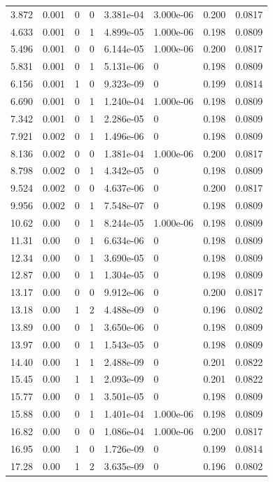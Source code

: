 \documentclass[preview]{standalone}
\begin{document}
{{\begin{tabular}{L{1.2cm}C{1.2cm} C{0.3cm}C{0.5cm} C{1.4cm}C{1.4cm} C{1.4cm}C{1.4cm}}
  3.872  &  0.001  & 0     &  0 &  3.381e-04  & 3.000e-06  & 0.200 &  0.0817   \\ 
  4.633  &  0.001  & 0     &  1 &  4.899e-05  & 1.000e-06  & 0.198 &  0.0809   \\ 
  5.496  &  0.001  & 0     &  0 &  6.144e-05  & 1.000e-06  & 0.200 &  0.0817   \\ 
  5.831  &  0.001  & 0     &  1 &  5.131e-06  & 0  & 0.198 &  0.0809   \\ 
  6.156  &  0.001  & 1     &  0 &  9.323e-09  & 0  & 0.199 &  0.0814   \\ 
  6.690  &  0.001  & 0     &  1 &  1.240e-04  & 1.000e-06  & 0.198 &  0.0809   \\ 
  7.342  &  0.001  & 0     &  1 &  2.286e-05  & 0  & 0.198 &  0.0809   \\ 
  7.921  &  0.002  & 0     &  1 &  1.496e-06  & 0  & 0.198 &  0.0809   \\ 
  8.136  &  0.002  & 0     &  0 &  1.381e-04  & 1.000e-06  & 0.200 &  0.0817   \\ 
  8.798  &  0.002  & 0     &  1 &  4.342e-05  & 0  & 0.198 &  0.0809   \\ 
  9.524  &  0.002  & 0     &  0 &  4.637e-06  & 0  & 0.200 &  0.0817   \\ 
  9.956  &  0.002  & 0     &  1 &  7.548e-07  & 0  & 0.198 &  0.0809   \\ 
  10.62  &  0.00  & 0     &  1 &  8.244e-05  & 1.000e-06  & 0.198 &  0.0809   \\ 
  11.31  &  0.00  & 0     &  1 &  6.634e-06  & 0  & 0.198 &  0.0809   \\ 
  12.34  &  0.00  & 0     &  1 &  3.690e-05  & 0  & 0.198 &  0.0809   \\ 
  12.87  &  0.00  & 0     &  1 &  1.304e-05  & 0  & 0.198 &  0.0809   \\ 
  13.17  &  0.00  & 0     &  0 &  9.912e-06  & 0  & 0.200 &  0.0817   \\ 
  13.18  &  0.00  & 1     &  2 &  4.488e-09  & 0  & 0.196 &  0.0802   \\ 
  13.89  &  0.00  & 0     &  1 &  3.650e-06  & 0  & 0.198 &  0.0809   \\ 
  13.97  &  0.00  & 0     &  1 &  1.543e-05  & 0  & 0.198 &  0.0809   \\ 
  14.40  &  0.00  & 1     &  1 &  2.488e-09  & 0  & 0.201 &  0.0822   \\ 
  15.45  &  0.00  & 1     &  1 &  2.093e-09  & 0  & 0.201 &  0.0822   \\ 
  15.77  &  0.00  & 0     &  1 &  3.501e-05  & 0  & 0.198 &  0.0809   \\ 
  15.88  &  0.00  & 0     &  1 &  1.401e-04  & 1.000e-06  & 0.198 &  0.0809   \\ 
  16.82  &  0.00  & 0     &  0 &  1.086e-04  & 1.000e-06  & 0.200 &  0.0817   \\ 
  16.95  &  0.00  & 1     &  0 &  1.726e-09  & 0  & 0.199 &  0.0814   \\ 
  17.28  &  0.00  & 1     &  2 &  3.635e-09  & 0  & 0.196 &  0.0802   \\ 
\hline 
\end{tabular} 

}}
\end{document}
